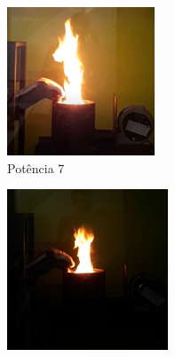 \begin{figure}[!ht]
     \centering
        \caption{Aspecto da chama nos três diferentes testes.}
        \label{fig:phi0,7tres}
     \begin{subfigure}[b]{0.3\textwidth}
         \centering
         \includegraphics[width=\textwidth]{Textuais/results/0,7posicao7.png}
         \caption{Potência 7}
         \label{fig:pot7}
     \end{subfigure}
     \hfill
     \begin{subfigure}[b]{0.3\textwidth}
         \centering
         \includegraphics[width=\textwidth]{Textuais/results/0,7posicao5.png}

\end{subfigure}
\end{figure}
